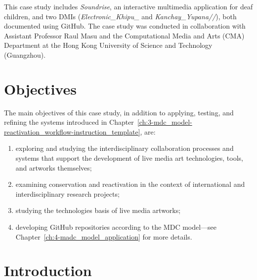 This case study includes \textit{Soundrise}, an interactive multimedia application for deaf children, and two DMIs (\textit{Electronic\_Khipu\_} and \textit{Kanchay\_Yupana//}), both documented using GitHub. The case study was conducted in collaboration with Assistant Professor Raul Masu and the Computational Media and Arts (CMA) Department at the Hong Kong University of Science and Technology (Guangzhou).

\section{Objectives}
The main objectives of this case study, in addition to applying, testing, and refining the systems introduced in Chapter~\ref{ch:3-mdc_model-reactivation_workflow-instruction_template}, are:
\begin{enumerate}
    \item exploring and studying the interdisciplinary collaboration processes and systems that support the development of live media art technologies, tools, and artworks themselves;
    \item examining conservation and reactivation in the context of international and interdisciplinary research projects;
    \item studying the technologies basis of live media artworks;
    \item developing GitHub repositories according to the MDC model—see Chapter~\ref{ch:4-madc_model_application} for more details.
\end{enumerate}

\section{Introduction}
